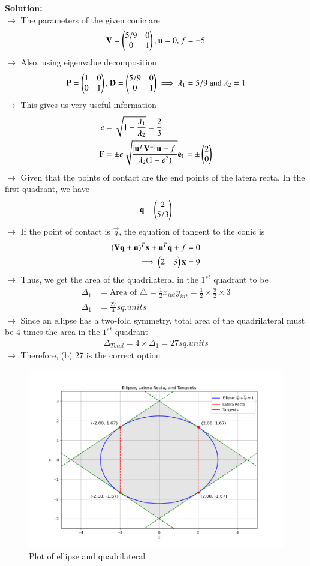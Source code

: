 \documentclass[journal]{IEEEtran}
\begin{document}
\textbf{Solution:}\\
$\rightarrow$ The parameters of the given conic are
\begin{align}
    \mathbf{V} = \begin{pmatrix}5/9&0\\0&1\end{pmatrix}\text{, } \mathbf{u} = 0\text{, } f = -5
\end{align}
$\rightarrow$ Also, using eigenvalue decomposition
\begin{align}
    \mathbf{P} = \begin{pmatrix}1&0\\0&1\end{pmatrix}\text{, } \mathbf{D} = \begin{pmatrix}5/9&0\\0&1\end{pmatrix} \implies \lambda_1 = 5/9\text{ and } \lambda_2 = 1
\end{align}
$\rightarrow$ This gives us very useful information
\begin{align}
    e &= \sqrt{1-\frac{\lambda_1}{\lambda_2}} = \frac{2}{3} \\
    \mathbf{F} &= \pm e\sqrt{\frac{\vert\mathbf{u}^T\mathbf{V}^{-1}\mathbf{u}-f\vert}{\lambda_2(1-e^2)}}\mathbf{e_1} = \pm\begin{pmatrix}2\\0\end{pmatrix}
\end{align}
$\rightarrow$ Given that the points of contact are the end points of the latera recta. In the first quadrant, we have
\begin{align}
    \mathbf{q} = \begin{pmatrix}2\\5/3\end{pmatrix}
\end{align}
$\rightarrow$ If the point of contact is $\vec{q}$, the equation of tangent to the conic is
\begin{align}
    (\mathbf{V}\mathbf{q}+\mathbf{u})^T\mathbf{x} + \mathbf{u}^T\mathbf{q} + f = 0\\
    \implies \begin{pmatrix}2&3\end{pmatrix}\mathbf{x} = 9 
\end{align}
$\rightarrow$ Thus, we get the area of the quadrilateral in the $1^{st}$ quadrant to be
\begin{align}
    \Delta_1 &= \text{Area of }\triangle = \frac{1}{2}x_{int}y_{int} = \frac{1}{2}\times\frac{9}{2}\times3 \\
    \Delta_1 &= \frac{27}{4} sq. units
\end{align}
$\rightarrow$ Since an ellipse has a two-fold symmetry, total area of the quadrilateral must be $4$ times the area in the $1^{st}$ quadrant
\begin{align}
    \Delta_{Total} = 4\times\Delta_1 = 27 sq. units
\end{align}
$\rightarrow$ Therefore, (b) 27 is the correct option
\begin{figure}[h!]
   \centering
   \includegraphics[width=\linewidth]{figs/01.png}
   \caption{Plot of ellipse and quadrilateral}
   \label{Plot_1}
\end{figure}
\end{document}
